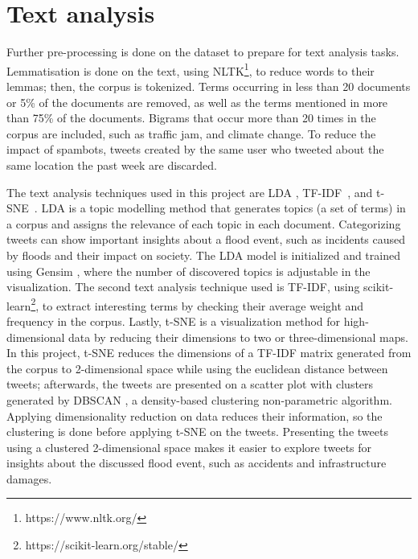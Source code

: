 \section{Text analysis}

Further pre-processing is done on the dataset to prepare for text analysis tasks. Lemmatisation is
done on the text, using \ac{NLTK}\footnote{https://www.nltk.org/}, to reduce words to their lemmas;
then, the corpus is tokenized. Terms occurring in less than 20 documents or 5\% of
the documents are removed, as well as the terms mentioned in more than 75\% of the documents.
Bigrams that occur more than 20 times in the corpus are included, such as traffic jam, and climate
change. To reduce the impact of spambots, tweets created by the same user who tweeted about the same location the past
week are discarded.

The text analysis techniques used in this project are \ac{LDA}
\cite{falushInferencePopulationStructure2003}\cite{pritchardInferencePopulationStructure2000},
\ac{TF-IDF}~\cite{enwiki:1143165699}, and \ac{t-SNE}~\cite{vandermaatenVisualizingHighDimensionalData2008}. \ac{LDA} is a
topic modelling method that generates topics (a set of terms) in a corpus and assigns the relevance
of each topic in each document. Categorizing tweets can show important insights about a flood event,
such as incidents caused by floods and their impact on society. The \ac{LDA} model is initialized
and trained using Gensim \cite{rehurek_lrec}, where the number of discovered topics is adjustable in
the visualization. The second text analysis technique used is \ac{TF-IDF}, using
scikit-learn\footnote{https://scikit-learn.org/stable/}, to extract interesting terms by checking
their average weight and frequency in the corpus. Lastly, \ac{t-SNE} is a visualization method for
high-dimensional data by reducing their dimensions to two or three-dimensional maps. In this
project, \ac{t-SNE} reduces the dimensions of a \ac{TF-IDF} matrix generated from the corpus to
2-dimensional space while using the euclidean distance between tweets; afterwards, the tweets are
presented on a scatter plot with clusters generated by \ac{DBSCAN}
\cite{esterDensitybasedAlgorithmDiscovering1996}, a density-based clustering non-parametric
algorithm. Applying dimensionality reduction on data reduces their information, so the clustering is
done before applying \ac{t-SNE} on the tweets. Presenting the tweets using a clustered 2-dimensional
space makes it easier to explore tweets for insights about the discussed flood event, such as
accidents and infrastructure damages.

